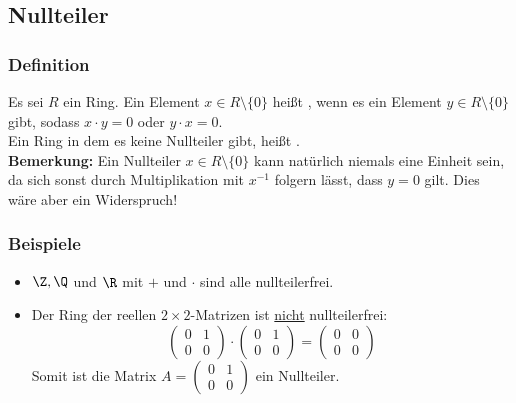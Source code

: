 \subsection{Nullteiler}
%
\begin{frame}\frametitle{Definition}
Es sei $R$ ein Ring. Ein Element $x\in R\setminus \{0\}$ heißt , wenn es ein Element $y \in R\setminus \{0\}$ gibt, sodass $x \cdot y = 0$ oder $y \cdot x = 0$.\\
Ein Ring in dem es keine Nullteiler gibt, heißt .\\
\vfill \pause
\textbf{Bemerkung:} Ein Nullteiler $x \in R\setminus \{0\}$ kann natürlich niemals eine Einheit sein, da sich sonst durch Multiplikation mit $x^{-1}$ folgern lässt, dass $y=0$ gilt. Dies wäre aber ein Widerspruch!
\end{frame}
%
\begin{frame}\frametitle{Beispiele}
\begin{itemize}
\item $\Z,\Q$ und $\R$ mit $+$ und $\cdot$ sind alle nullteilerfrei. \pause \vfill
\item Der Ring der reellen $2\times 2$-Matrizen ist \underline{nicht} nullteilerfrei: \pause
$$
\begin{pmatrix} 0 & 1 \\ 0 &0\end{pmatrix} \cdot \begin{pmatrix} 0 & 1 \\ 0 &0\end{pmatrix} = \begin{pmatrix} 0 & 0 \\ 0 &0\end{pmatrix}
$$
Somit ist die Matrix $A=\begin{pmatrix} 0&1\\0&0 \end{pmatrix}$ ein Nullteiler.
\end{itemize}
\end{frame}
%
